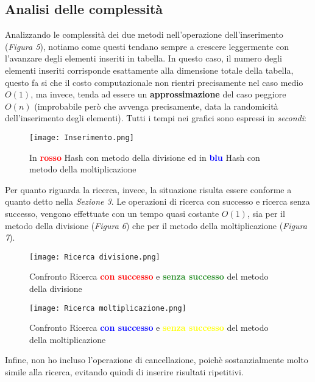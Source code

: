 \documentclass{article}
\begin{document}
\subsection{Analisi delle complessità}
Analizzando le complessità dei due metodi nell'operazione dell'inserimento (\textit{Figura 5}), notiamo come questi tendano sempre a crescere leggermente con l'avanzare degli elementi inseriti in tabella.
In questo caso, il numero degli elementi inseriti corrisponde esattamente alla dimensione totale della tabella, questo fa si che il costo computazionale non rientri precisamente nel caso medio $O(1)$, ma invece, tenda ad essere un \textbf{approssimazione} del caso peggiore $O(n)$ (improbabile però che avvenga precisamente, data la randomicità dell'inserimento degli elementi). Tutti i tempi nei grafici sono espressi in \textit{secondi}:
\begin{figure}[!ht]
        \centering
        \texttt{[image: Inserimento.png]}
        \caption{In \textbf{\textcolor{red}{rosso}} Hash con metodo della divisione ed in \textbf{\textcolor{blue}{blu}} Hash con metodo della moltiplicazione}
        \label{fig:div_vs_mul}
\end{figure}

\clearpage

Per quanto riguarda la ricerca, invece, la situazione risulta essere conforme a quanto detto nella \textit{Sezione 3}. Le operazioni di ricerca con successo e ricerca senza successo, vengono effettuate con un tempo quasi costante $O(1)$, sia per il metodo della divisione (\textit{Figura 6}) che per il metodo della moltiplicazione (\textit{Figura 7}).
\begin{figure}[!ht]
        \centering
        \texttt{[image: Ricerca divisione.png]}
        \caption{Confronto Ricerca \textbf{\textcolor{red}{con successo}} e \textbf{\textcolor{ForestGreen}{senza successo}} del metodo della divisione}
        \label{fig:succ_search}
\end{figure}

\begin{figure}[!ht]
        \centering
        \texttt{[image: Ricerca moltiplicazione.png]}
        \caption{Confronto Ricerca \textbf{\textcolor{blue}{con successo}} e \textbf{\textcolor{yellow}{senza successo}} del metodo della moltiplicazione}
        \label{fig:no_succ_search}
\end{figure}

Infine, non ho incluso l'operazione di cancellazione, poichè sostanzialmente molto simile alla ricerca, evitando quindi di inserire risultati ripetitivi.
\end{document}
